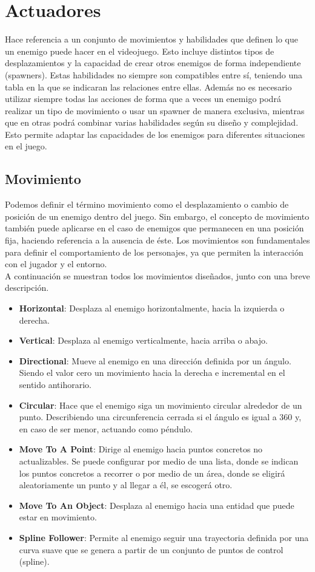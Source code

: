 \section{Actuadores}
\label{subsec:acciones}
Hace referencia a un conjunto de movimientos y habilidades que definen lo que un enemigo puede hacer en el videojuego. Esto incluye distintos tipos de desplazamientos y la capacidad de crear otros enemigos de forma independiente (spawners). Estas habilidades no siempre son compatibles entre sí, teniendo una tabla en la que se indicaran las relaciones entre ellas. Además no es necesario utilizar siempre todas las acciones de forma que a veces un enemigo podrá realizar un tipo de movimiento o usar un spawner de manera exclusiva, mientras que en otras podrá combinar varias habilidades según su diseño y complejidad. Esto permite adaptar las capacidades de los enemigos para diferentes situaciones en el juego.

\subsection{Movimiento}
Podemos definir el término movimiento como el desplazamiento o cambio de posición de un enemigo dentro del juego. Sin embargo, el concepto de movimiento también puede aplicarse en el caso de enemigos que permanecen en una posición fija, haciendo referencia a la ausencia de éste. Los movimientos son fundamentales para definir el comportamiento de los personajes, ya que permiten la interacción con el jugador y el entorno.\\

A continuación se muestran todos los movimientos diseñados, junto con una breve descripción.
\begin{itemize}
  \item \textbf{Horizontal}: Desplaza al enemigo horizontalmente, hacia la izquierda o derecha.
    \item \textbf{Vertical}: Desplaza al enemigo verticalmente, hacia arriba o abajo.
    \item \textbf{Directional}: Mueve al enemigo en una dirección definida por un ángulo. Siendo el valor cero un movimiento hacia la derecha e incremental en el sentido antihorario.
    \item \textbf{Circular}: Hace que el enemigo siga un movimiento circular alrededor de un punto. Describiendo una circunferencia cerrada si el ángulo es igual a 360 y, en caso de ser menor, actuando como péndulo.
    \item \textbf{Move To A Point}\label{sec:MoveToAPoint}: Dirige al enemigo hacia puntos concretos no actualizables. Se puede configurar por medio de una lista, donde se indican los puntos concretos a recorrer o por medio de un área, donde se eligirá aleatoriamente un punto y al llegar a él, se escogerá otro.
    \item \textbf{Move To An Object}: Desplaza al enemigo hacia una entidad que puede estar en movimiento.
    \item \textbf{Spline Follower}: Permite al enemigo seguir una trayectoria definida por una curva suave que se genera a partir de un conjunto de puntos de control (spline).
\end{itemize}

